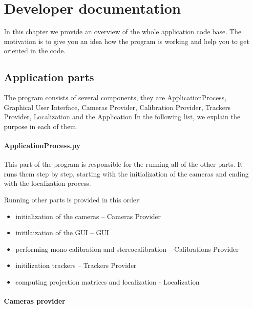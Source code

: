 \chapter{Developer documentation}


In this chapter we provide an overview of the whole application code base. The
motivation is to give you an idea how the program is working and help you to
get oriented in the code.

\section{Application parts}

The program consists of several components, they are ApplicationProcess, Graphical
User Interface, Cameras Provider, Calibration Provider, Trackers Provider,
Localization and the Application In the following list, we explain the purpose
in each of them.

\subsubsection*{ApplicationProcess.py}

This part of the program is responsible for the running all of the other parts.
It runs them step by step, starting with the initialization of the cameras and
ending with the localization process. 

Running other parts is provided in this order:
\begin{itemize}
\item initialization of the cameras -- Cameras Provider
\item initilaization of the GUI -- GUI
\item performing mono calibration and stereocalibration -- Calibrations Provider
\item initilization trackers -- Trackers Provider
\item computing projection matrices and localization  - Localization
\end{itemize}

\subsubsection*{Cameras provider}

